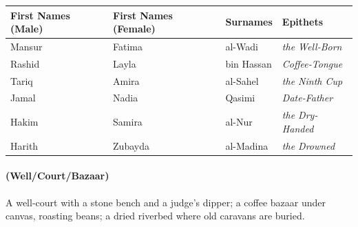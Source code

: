 \begin{longtable}{|p{}|p{}|p{}|p{}|}
\hline
\textbf{First Names (Male)} & \textbf{First Names (Female)} & \textbf{Surnames} & \textbf{Epithets} \\
\hline
Mansur & Fatima & al-Wadi & \textit{the Well-Born} \\
\hline
Rashid & Layla & bin Hassan & \textit{Coffee-Tongue} \\
\hline
Tariq & Amira & al-Sahel & \textit{the Ninth Cup} \\
\hline
Jamal & Nadia & Qasimi & \textit{Date-Father} \\
\hline
Hakim & Samira & al-Nur & \textit{the Dry-Handed} \\
\hline
Harith & Zubayda & al-Madina & \textit{the Drowned} \\
\hline
\end{longtable}

\paragraph*{(Well/Court/Bazaar)} A well-court with a stone bench and a judge's dipper; a coffee bazaar under canvas, roasting beans; a dried riverbed where old caravans are buried.


